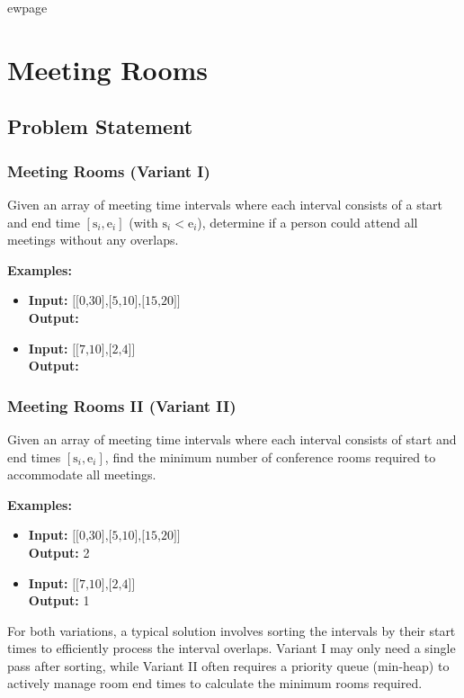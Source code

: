 
ewpage
\chapter{Meeting Rooms}
\label{chap:Meeting_Rooms}



\section*{Problem Statement}

\subsection*{Meeting Rooms (Variant I)}
Given an array of meeting time intervals where each interval consists of a start and end time \([\text{{s}}_i,\text{{e}}_i]\) (with \(\text{{s}}_i < \text{{e}}_i\)), determine if a person could attend all meetings without any overlaps. 

\textbf{Examples:}
\begin{itemize}
	\item \textbf{Input:} \(\text{[[0,30],[5,10],[15,20]]}\) \\
	\textbf{Output:} 
	\item \textbf{Input:} \(\text{[[7,10],[2,4]]}\) \\
	\textbf{Output:} 
\end{itemize}

\subsection*{Meeting Rooms II (Variant II)}
Given an array of meeting time intervals where each interval consists of start and end times \([\text{{s}}_i,\text{{e}}_i]\), find the minimum number of conference rooms required to accommodate all meetings. 

\textbf{Examples:}
\begin{itemize}
	\item \textbf{Input:} \(\text{[[0,30],[5,10],[15,20]]}\) \\
	\textbf{Output:} 2
	\item \textbf{Input:} \(\text{[[7,10],[2,4]]}\) \\
	\textbf{Output:} 1
\end{itemize}

For both variations, a typical solution involves sorting the intervals by their start times to efficiently process the interval overlaps. Variant I may only need a single pass after sorting, while Variant II often requires a priority queue (min-heap) to actively manage room end times to calculate the minimum rooms required.

